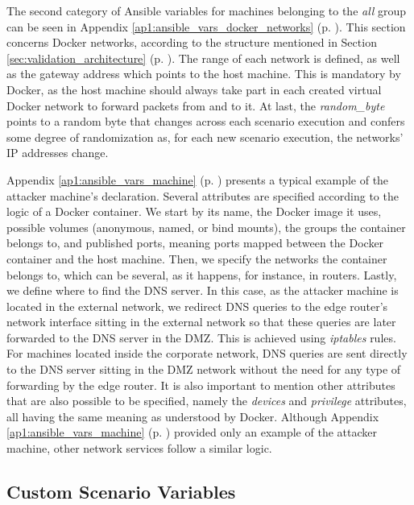 The second category of Ansible variables for machines belonging to the \textit{all} group can be seen in Appendix \ref{ap1:ansible_vars_docker_networks} (p. \pageref{ap1:ansible_vars_docker_networks}). This section concerns Docker networks, according to the structure mentioned in Section \ref{sec:validation_architecture} (p. \pageref{sec:validation_architecture}). The range of each network is defined, as well as the gateway address which points to the host machine. This is mandatory by Docker, as the host machine should always take part in each created virtual Docker network to forward packets from and to it. At last, the \textit{random\_byte} points to a random byte that changes across each scenario execution and confers some degree of randomization as, for each new scenario execution, the networks' IP addresses change. 

Appendix \ref{ap1:ansible_vars_machine} (p. \pageref{ap1:ansible_vars_machine}) presents a typical example of the attacker machine's declaration. Several attributes are specified according to the logic of a Docker container. We start by its name, the Docker image it uses, possible volumes (anonymous, named, or bind mounts), the groups the container belongs to, and published ports, meaning ports mapped between the Docker container and the host machine. Then, we specify the networks the container belongs to, which can be several, as it happens, for instance, in routers. Lastly, we define where to find the DNS server. In this case, as the attacker machine is located in the external network, we redirect DNS queries to the edge router's network interface sitting in the external network so that these queries are later forwarded to the DNS server in the DMZ. This is achieved using \textit{iptables} rules. For machines located inside the corporate network, DNS queries are sent directly to the DNS server sitting in the DMZ network without the need for any type of forwarding by the edge router. It is also important to mention other attributes that are also possible to be specified, namely the \textit{devices} and \textit{privilege} attributes, all having the same meaning as understood by Docker. Although Appendix \ref{ap1:ansible_vars_machine} (p. \pageref{ap1:ansible_vars_machine}) provided only an example of the attacker machine, other network services follow a similar logic.

\subsection{Custom Scenario Variables} \label{sec:custom_scenario_variables}

